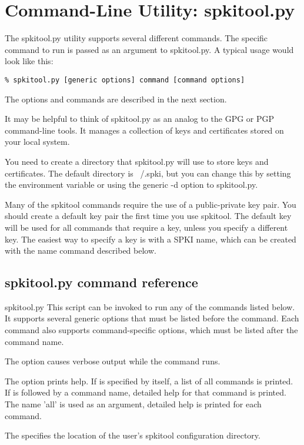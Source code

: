 \documentclass{howto}
\begin{document}
\section{Command-Line Utility: spkitool.py}

The spkitool.py utility supports several different commands.  The
specific command to run is passed as an argument to spkitool.py.
A typical usage would look like this:
\begin{verbatim}
% spkitool.py [generic options] command [command options]
\end{verbatim}
The options and commands are described in the next section.

It may be helpful to think of spkitool.py as an analog to the GPG or
PGP command-line tools.  It manages a collection of keys and
certificates stored on your local system.

You need to create a directory that spkitool.py will use to store keys
and certificates.  The default directory is ~/.spki, but you can
change this by setting the  environment variable or
using the generic -d option to spkitool.py.

Many of the spkitool commands require the use of a public-private key
pair.  You should create a default key pair the first time you use
spkitool.  The default key will be used for all commands that require
a key, unless you specify a different key.  The easiest way to specify 
a key is with a SPKI name, which can be created with the name command
described below.

\subsection{spkitool.py command reference}

\begin{datadescni}{spkitool.py  
	  }
This script can be invoked to run any of the commands listed below.
It supports several generic options that must be listed before the
command.  Each command also supports command-specific options, which
must be listed after the command name.

The  option causes verbose output while the command
runs.

The  option prints help.  If  is
specified by itself, a list of all commands is printed.  If
 is followed by a command name, detailed help for that
command is printed.  The name 'all' is used as an argument, detailed
help is printed for each command.

The  specifies the location of the user's
spkitool configuration directory.  
\end{datadescni}
\end{document}
